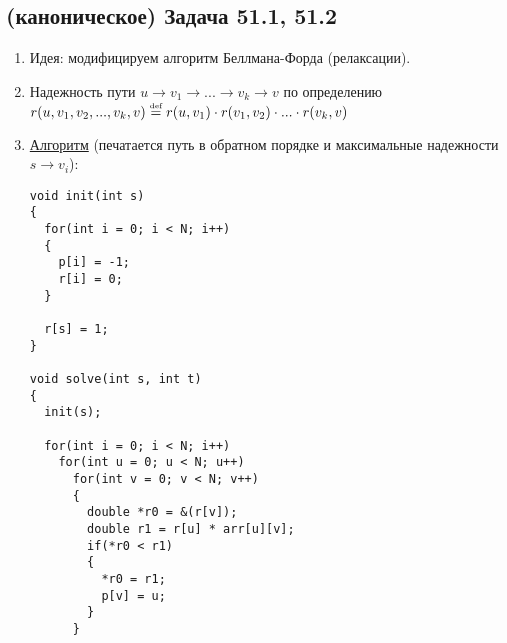 \documentclass[a4paper]{article}
\def\eqdef{\overset{\mbox{\tiny def}}{=}}
\begin{document}
\subsection*{(каноническое) Задача 51.1, 51.2}
\begin{enumerate}
\item Идея: модифицируем алгоритм Беллмана-Форда (релаксации).
\item Надежность пути $u\to v_1\to...\to v_k\to v$ по определению $r(u,v_1,v_2,...,v_k,v)\eqdef r(u,v_1)\cdot r(v_1,v_2)\cdot...\cdot r(v_k,v)$
\item \href{https://bitbucket.org/etoestja/inf/raw/HEAD/mipt/s4/AACM/C/R2/main.cpp}{Алгоритм} (печатается путь в обратном порядке и максимальные надежности $s\to v_i$):
\begin{lstlisting}
void init(int s)
{
  for(int i = 0; i < N; i++)
  {
    p[i] = -1;
    r[i] = 0;
  }

  r[s] = 1;
}

void solve(int s, int t)
{
  init(s);

  for(int i = 0; i < N; i++)
    for(int u = 0; u < N; u++)
      for(int v = 0; v < N; v++)
      {
        double *r0 = &(r[v]);
        double r1 = r[u] * arr[u][v];
        if(*r0 < r1)
        {
          *r0 = r1;
          p[v] = u;
        }
      }


\end{lstlisting}
\end{enumerate}
\end{document}
